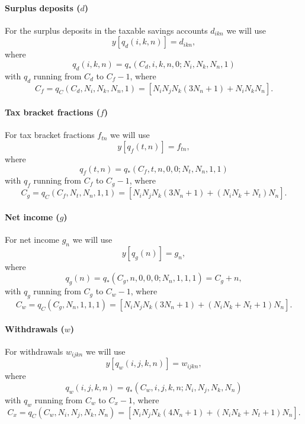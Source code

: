 \documentclass{article}[fleqn,12pt]
\begin{document}
\paragraph*{Surplus deposits (\boldmath$d$)}
For the surplus deposits in the taxable savings accounts $d_{ikn}$ we will use
\begin{equation}
	y[q_d(i, k, n)] = d_{ikn},
\end{equation}
where
\begin{equation}
	q_d(i, k, n) = q_*(C_d, i, k, n, 0; N_i, N_k, N_n, 1)
\end{equation}
with $q_d$ running from $C_d$ to $C_f - 1$, where
\[
	C_f = q_C(C_d, N_i, N_k, N_n, 1) = [N_iN_jN_k(3N_n+1) + N_iN_kN_n].
\]

\paragraph*{Tax bracket fractions (\boldmath$f$)}
For tax bracket fractions $f_{t n}$ we will use
\begin{equation}
	y[q_f(t, n)] = f_{t n},
\end{equation}
where
\begin{equation}
	q_f(t, n) = q_*(C_f, t, n, 0, 0; N_t, N_n, 1, 1)
\end{equation}
with $q_f$ running from $C_f$ to $C_g - 1$, where
\[
	C_g = q_C(C_f, N_t, N_n, 1, 1) = [N_iN_jN_k(3N_n+1) + (N_iN_k + N_t) N_n].
\]

\paragraph*{Net income (\boldmath$g$)}
For net income $g_{n}$ we will use
\begin{equation}
	y[q_g(n)] = g_{n},
\end{equation}
where
\begin{equation}
	q_g(n) = q_*(C_g, n, 0, 0, 0; N_n, 1, 1, 1) = C_g + n,
\end{equation}
with $q_g$ running from $C_g$ to $C_w - 1$, where
\[
	C_w = q_C(C_g, N_n, 1, 1, 1) = [N_iN_jN_k(3N_n+1) + (N_iN_k + N_t + 1) N_n].
\]

\paragraph*{Withdrawals (\boldmath$w$)}
For withdrawals $w_{ijkn}$ we will use
\begin{equation}
	y[q_w(i, j, k, n)] = w_{i j k n},
\end{equation}
where
\begin{equation}
	q_w(i, j, k, n) = q_*(C_w, i, j, k, n; N_i, N_j, N_k, N_n)
\end{equation}
with $q_w$ running from $C_w$ to $C_x - 1$, where
\[
	C_x = q_C(C_w, N_i, N_j, N_k, N_n) = [N_iN_jN_k(4N_n + 1) + (N_iN_k + N_t + 1) N_n].
\]
\end{document}
